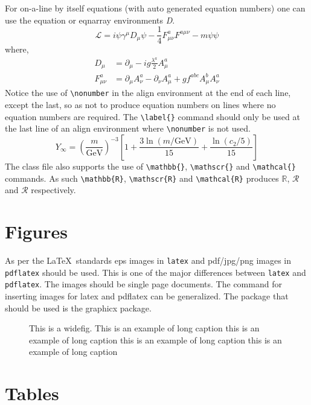 \documentclass{CUP-JNL-DTM}%
\theoremstyle{definition}
\numberwithin{equation}{section}
\begin{document}
For on-a-line by itself equations (with auto generated equation numbers)
one can use the equation or eqnarray environments \textit{D}.
\begin{equation}
\mathcal{L} = i {\psi} \gamma^\mu D_\mu \psi
    - \frac{1}{4} F_{\mu\nu}^a F^{a\mu\nu} - m {\psi} \psi
\label{eq1}
\end{equation}
where,
\begin{align}
D_\mu &=  \partial_\mu - ig \frac{\lambda^a}{2} A^a_\mu
\nonumber \\
F^a_{\mu\nu} &= \partial_\mu A^a_\nu - \partial_\nu A^a_\mu
    + g f^{abc} A^b_\mu A^a_\nu
\label{eq2}
\end{align}
Notice the use of \verb+\nonumber+ in the align environment at the end
of each line, except the last, so as not to produce equation numbers on
lines where no equation numbers are required. The \verb+\label{}+ command
should only be used at the last line of an align environment where
\verb+\nonumber+ is not used.
\begin{equation}
Y_\infty = \left( \frac{m}{\textrm{GeV}} \right)^{-3}
    \left[ 1 + \frac{3 \ln(m/\textrm{GeV})}{15}
    + \frac{\ln(c_2/5)}{15} \right]
\end{equation}
The class file also supports the use of \verb+\mathbb{}+, \verb+\mathscr{}+ and
\verb+\mathcal{}+ commands. As such \verb+\mathbb{R}+, \verb+\mathscr{R}+
and \verb+\mathcal{R}+ produces $\mathbb{R}$, $\mathscr{R}$ and $\mathcal{R}$
respectively.

\section{Figures}

As per the \LaTeX\ standards eps images in \verb!latex! and pdf/jpg/png images in
\verb!pdflatex! should be used. This is one of the major differences between \verb!latex!
and \verb!pdflatex!. The images should be single page documents. The command for inserting images
for latex and pdflatex can be generalized. The package that should be used
is the graphicx package.

\begin{figure}[t]%
{\caption{This is a widefig. This is an example of long caption this is an example of long caption  this is an example of long caption this is an example of long caption}
\label{fig1}}
\end{figure}



\section{Tables}
\end{document}
